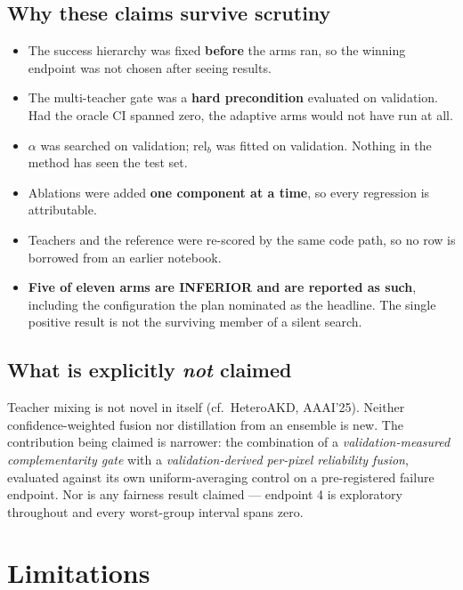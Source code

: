 \documentclass[11pt]{article}
\begin{document}
\subsection{Why these claims survive scrutiny}

\begin{itemize}[leftmargin=1.6em,itemsep=3pt]
  \item The success hierarchy was fixed \textbf{before} the arms ran, so the winning endpoint was
        not chosen after seeing results.
  \item The multi-teacher gate was a \textbf{hard precondition} evaluated on validation. Had the
        oracle CI spanned zero, the adaptive arms would not have run at all.
  \item $\alpha$ was searched on validation; $\mathrm{rel}_b$ was fitted on validation. Nothing in
        the method has seen the test set.
  \item Ablations were added \textbf{one component at a time}, so every regression is attributable.
  \item Teachers and the reference were re-scored by the same code path, so no row is borrowed
        from an earlier notebook.
  \item \textbf{Five of eleven arms are INFERIOR and are reported as such}, including the
        configuration the plan nominated as the headline. The single positive result is not the
        surviving member of a silent search.
\end{itemize}

\subsection{What is explicitly \emph{not} claimed}

Teacher mixing is not novel in itself (cf.\ HeteroAKD, AAAI'25). Neither confidence-weighted
fusion nor distillation from an ensemble is new. The contribution being claimed is narrower: the
combination of a \emph{validation-measured complementarity gate} with a \emph{validation-derived
per-pixel reliability fusion}, evaluated against its own uniform-averaging control on a
pre-registered failure endpoint. Nor is any fairness result claimed --- endpoint 4 is exploratory
throughout and every worst-group interval spans zero.

\section{Limitations}
\end{document}
